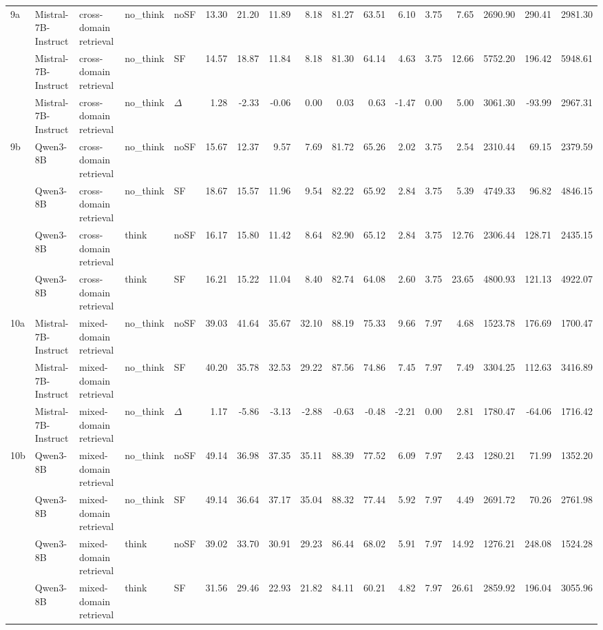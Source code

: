 \begin{landscape}
\begin{footnotesize}
\begin{longtable}{l l l l l r r r r r r r r r r r r}
\midrule
9a & Mistral-7B-Instruct & cross-domain retrieval & no\_think & noSF & 13.30 & 21.20 & 11.89 & 8.18 & 81.27 & 63.51 & 6.10 & 3.75 & 7.65 & 2690.90 & 290.41 & 2981.30 \\
 & Mistral-7B-Instruct & cross-domain retrieval & no\_think & SF & 14.57 & 18.87 & 11.84 & 8.18 & 81.30 & 64.14 & 4.63 & 3.75 & 12.66 & 5752.20 & 196.42 & 5948.61 \\
 & Mistral-7B-Instruct & cross-domain retrieval & no\_think & $\Delta$ & 1.28 & -2.33 & -0.06 & 0.00 & 0.03 & 0.63 & -1.47 & 0.00 & 5.00 & 3061.30 & -93.99 & 2967.31 \\
9b & Qwen3-8B & cross-domain retrieval & no\_think & noSF & 15.67 & 12.37 & 9.57 & 7.69 & 81.72 & 65.26 & 2.02 & 3.75 & 2.54 & 2310.44 & 69.15 & 2379.59 \\
 & Qwen3-8B & cross-domain retrieval & no\_think & SF & 18.67 & 15.57 & 11.96 & 9.54 & 82.22 & 65.92 & 2.84 & 3.75 & 5.39 & 4749.33 & 96.82 & 4846.15 \\
 & Qwen3-8B & cross-domain retrieval & think & noSF & 16.17 & 15.80 & 11.42 & 8.64 & 82.90 & 65.12 & 2.84 & 3.75 & 12.76 & 2306.44 & 128.71 & 2435.15 \\
 & Qwen3-8B & cross-domain retrieval & think & SF & 16.21 & 15.22 & 11.04 & 8.40 & 82.74 & 64.08 & 2.60 & 3.75 & 23.65 & 4800.93 & 121.13 & 4922.07 \\
\midrule
10a & Mistral-7B-Instruct & mixed-domain retrieval & no\_think & noSF & 39.03 & 41.64 & 35.67 & 32.10 & 88.19 & 75.33 & 9.66 & 7.97 & 4.68 & 1523.78 & 176.69 & 1700.47 \\
 & Mistral-7B-Instruct & mixed-domain retrieval & no\_think & SF & 40.20 & 35.78 & 32.53 & 29.22 & 87.56 & 74.86 & 7.45 & 7.97 & 7.49 & 3304.25 & 112.63 & 3416.89 \\
 & Mistral-7B-Instruct & mixed-domain retrieval & no\_think & $\Delta$ & 1.17 & -5.86 & -3.13 & -2.88 & -0.63 & -0.48 & -2.21 & 0.00 & 2.81 & 1780.47 & -64.06 & 1716.42 \\
10b & Qwen3-8B & mixed-domain retrieval & no\_think & noSF & 49.14 & 36.98 & 37.35 & 35.11 & 88.39 & 77.52 & 6.09 & 7.97 & 2.43 & 1280.21 & 71.99 & 1352.20 \\
 & Qwen3-8B & mixed-domain retrieval & no\_think & SF & 49.14 & 36.64 & 37.17 & 35.04 & 88.32 & 77.44 & 5.92 & 7.97 & 4.49 & 2691.72 & 70.26 & 2761.98 \\
 & Qwen3-8B & mixed-domain retrieval & think & noSF & 39.02 & 33.70 & 30.91 & 29.23 & 86.44 & 68.02 & 5.91 & 7.97 & 14.92 & 1276.21 & 248.08 & 1524.28 \\
 & Qwen3-8B & mixed-domain retrieval & think & SF & 31.56 & 29.46 & 22.93 & 21.82 & 84.11 & 60.21 & 4.82 & 7.97 & 26.61 & 2859.92 & 196.04 & 3055.96 \\
\end{longtable}
\end{footnotesize}
\end{landscape}
